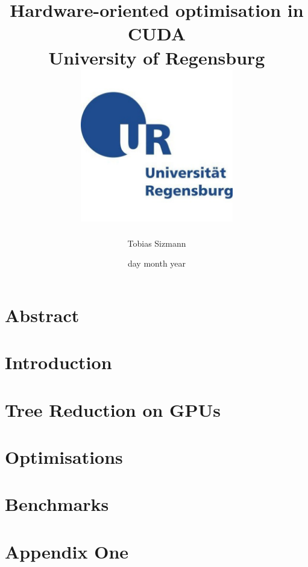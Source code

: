 \documentclass[12pt, twoside]{report}
\title{
    {Hardware-oriented optimisation in CUDA} \\
    {\large University of Regensburg} \\
    {\includegraphics[width = 0.5\textwidth]{ur_logo.jpg}}
}
\author{Tobias Sizmann}
\date{day month year}
\begin{document}
\maketitle

\chapter*{Abstract}

\tableofcontents

\chapter{Introduction}


\chapter{Tree Reduction on GPUs}


\chapter{Optimisations}


\chapter{Benchmarks}

\appendix
\chapter{Appendix One}


\printbibliography
\end{document}
